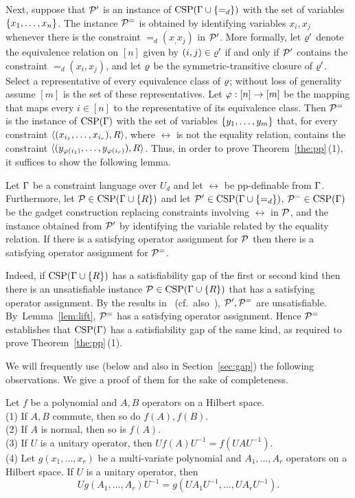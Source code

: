 \documentclass[11pt,letter]{article}
\begin{document}
Next, suppose that ${\mathcal P}'$ is an instance of ${\rm CSP}(\Gamma\cup\{=_d\})$ with the set of variables $\{x _1,\ldots, x _{n}\}$. The instance ${\mathcal P}^=$ is obtained by identifying variables $x_i,x_j$ whenever there is the constraint $=_d(x_,x_j)$ in ${\mathcal P}'$. More formally, let $\varrho'$ denote the equivalence relation on $[n]$ given by $(i,j)\in\varrho'$ if and only if ${\mathcal P}'$ contains the constraint $=_d(x_i,x_j)$, and let $\varrho$ be the symmetric-transitive closure of $\varrho'$. Select a representative of every equivalence class of $\varrho$; without loss of generality assume $[m]$ is the set of these representatives. Let $\varphi:[n]\to[m]$ be the mapping that maps every $i\in[n]$ to the representative of its equivalence class. Then ${\mathcal P}^=$ is the instance of ${\rm CSP}(\Gamma)$ with the set of variables $\{y _1,\ldots, y _{m}\}$ that, for every constraint $\langle (x_{i_1},\ldots, x_{i_r}),R \rangle$, where $\rel$ is not the equality relation, contains the constraint $\langle (y_{\varphi(i_1)},\ldots, y_{\varphi(i_r)}),R \rangle$.
Thus, in order to prove Theorem~\ref{the:pp}\,(1), it suffices to show the following lemma.

\begin{lemma}\label{lem:lift}
  Let $\Gamma$ be a constraint language over $U_d$ and let $\rel$ be pp-definable
  from $\Gamma$. Furthermore, let ${\mathcal P}\in{\rm CSP}(\Gamma\cup\{R\})$ and let
  ${\mathcal P}'\in{\rm CSP}(\Gamma\cup\{=_d\})$, ${\mathcal P}^=\in{\rm CSP}(\Gamma)$ be the gadget construction replacing constraints involving
  $\rel$ in ${\mathcal P}$, and the instance obtained from ${\mathcal P}'$ by identifying the variable related by the equality relation. If there is a satisfying operator assignment for ${\mathcal P}$ then there is a satisfying operator assignment for ${\mathcal P}^=$. 
\end{lemma}

Indeed, if ${\rm CSP}(\Gamma\cup\{R\})$ has a satisfiability gap of the first or second kind then there is an unsatisfiable instance ${\mathcal P}\in{\rm CSP}(\Gamma\cup\{R\})$ that has a satisfying operator assignment. By the results in~\cite{Bulatov05:classifying} (cf.~also~\cite{BKW17}), ${\mathcal P}',{\mathcal P}^=$ are unsatisfiable. By~Lemma~\ref{lem:lift}, ${\mathcal P}^=$ has a satisfying operator assignment. Hence ${\mathcal P}^=$ establishes that ${\rm CSP}(\Gamma)$ has a satisfiability gap of the same kind, as required to prove Theorem~\ref{the:pp}\,(1).

We will frequently use (below and also in Section~\ref{sec:gap}) the following observations. We give a proof of them for the sake of completeness.

\begin{lemma}\label{lem:matrix-polys}
Let $f$ be a polynomial and $A,B$ operators on a Hilbert space.\\[2mm]
(1) If $A,B$ commute, then so do $f(A),f(B)$.\\
(2) If $A$ is normal, then so is $f(A)$.\\
(3) If $U$ is a unitary operator, then $Uf(A)U^{-1}=f(UAU^{-1})$.\\[1mm]
(4) Let $g(x_1,\dots,x_r)$ be a multi-variate polynomial and $A_1,\dots,A_r$
  operators on a Hilbert space. If $U$ is a unitary operator, then 
\[
Ug(A_1,\dots,A_r)U^{-1}=g(UA_1U^{-1},\dots,UA_rU^{-1}).
\]
\end{lemma}
\end{document}

